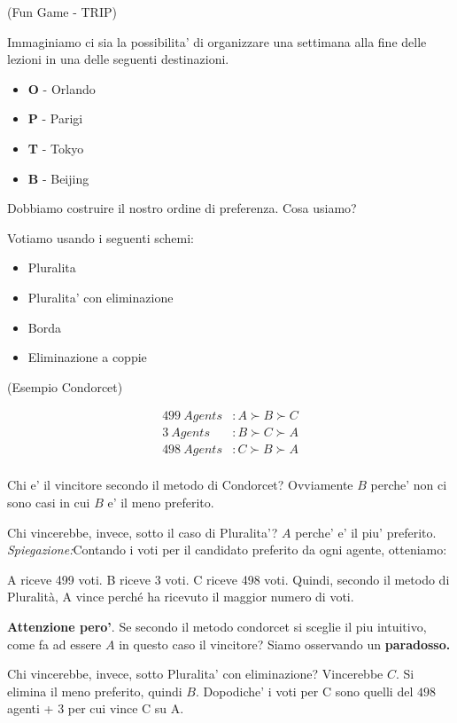 \begin{esempio}
    (Fun Game - TRIP)

    Immaginiamo ci sia la possibilita' di organizzare una settimana alla fine delle
    lezioni in una delle seguenti destinazioni.

    \begin{itemize}
        \item \textbf{O} - Orlando
        \item \textbf{P} - Parigi
        \item \textbf{T} - Tokyo
        \item \textbf{B} - Beijing
    \end{itemize}

    Dobbiamo costruire il nostro ordine di preferenza. Cosa usiamo?

    Votiamo usando i seguenti schemi:
    \begin{itemize}
        \item Pluralita
        \item Pluralita' con eliminazione
        \item Borda
        \item Eliminazione a coppie
    \end{itemize}
\end{esempio}

\begin{esempio}
    (Esempio Condorcet)

    \begin{equation}
        \begin{aligned}
            499 \ Agents & : A \succ B \succ C \\
            3 \ Agents   & : B \succ C \succ A \\
            498 \ Agents & : C \succ B \succ A \\
        \end{aligned}
    \end{equation}

    Chi e' il vincitore secondo il metodo di Condorcet? Ovviamente $B$ perche' non
    ci sono casi in cui $B$ e' il meno preferito.

    Chi vincerebbe, invece, sotto il caso di Pluralita'? $A$ perche' e' il piu'
    preferito. \textit{Spiegazione:}Contando i voti per il candidato preferito da
    ogni agente, otteniamo:

    A riceve 499 voti. B riceve 3 voti. C riceve 498 voti. Quindi, secondo il
    metodo di Pluralità, A vince perché ha ricevuto il maggior numero di voti.

    \textbf{Attenzione pero'}. Se secondo il metodo condorcet si sceglie il piu intuitivo,
    come fa ad essere $A$ in questo caso il vincitore? Siamo osservando un
    \textbf{paradosso.}

    Chi vincerebbe, invece, sotto Pluralita' con eliminazione? 
    Vincerebbe $C$. Si elimina il meno preferito, quindi $B$. Dopodiche' i 
    voti per C sono quelli del $498$ agenti + 3 per cui vince C su A.
\end{esempio}

